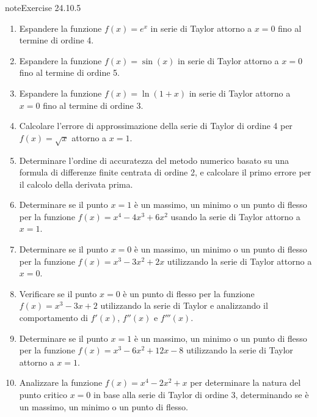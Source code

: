 \documentclass[letterpaper,10pt,italian]{jupyterBook}
\begin{document}
\begin{sphinxadmonition}{note}{Exercise 24.10.5}


\begin{enumerate}
%
\item {} 
\sphinxAtStartPar
Espandere la funzione \(f(x) = e^x\) in serie di Taylor attorno a \(x = 0\) fino al termine di ordine 4.

\item {} 
\sphinxAtStartPar
Espandere la funzione \(f(x) = \sin(x)\) in serie di Taylor attorno a \(x = 0\) fino al termine di ordine 5.

\item {} 
\sphinxAtStartPar
Espandere la funzione \(f(x) = \ln(1 + x)\) in serie di Taylor attorno a \(x = 0\) fino al termine di ordine 3.

\item {} 
\sphinxAtStartPar
Calcolare l’errore di approssimazione della serie di Taylor di ordine 4 per \(f(x) = \sqrt{x}\) attorno a \(x = 1\).

\item {} 
\sphinxAtStartPar
Determinare l’ordine di accuratezza del metodo numerico basato su una formula di differenze finite centrata di ordine 2, e calcolare il primo errore per il calcolo della derivata prima.

\item {} 
\sphinxAtStartPar
Determinare se il punto \(x = 1\) è un massimo, un minimo o un punto di flesso per la funzione \(f(x) = x^4 - 4x^3 + 6x^2\) usando la serie di Taylor attorno a \(x = 1\).

\item {} 
\sphinxAtStartPar
Determinare se il punto \(x = 0\) è un massimo, un minimo o un punto di flesso per la funzione \(f(x) = x^3 - 3x^2 + 2x\) utilizzando la serie di Taylor attorno a \(x = 0\).

\item {} 
\sphinxAtStartPar
Verificare se il punto \(x = 0\) è un punto di flesso per la funzione \(f(x) = x^3 - 3x + 2\) utilizzando la serie di Taylor e analizzando il comportamento di \(f'(x)\), \(f''(x)\) e \(f'''(x)\).

\item {} 
\sphinxAtStartPar
Determinare se il punto \(x = 1\) è un massimo, un minimo o un punto di flesso per la funzione \(f(x) = x^3 - 6x^2 + 12x - 8\) utilizzando la serie di Taylor attorno a \(x = 1\).

\item {} 
\sphinxAtStartPar
Analizzare la funzione \(f(x) = x^4 - 2x^2 + x\) per determinare la natura del punto critico \(x = 0\) in base alla serie di Taylor di ordine 3, determinando se è un massimo, un minimo o un punto di flesso.

\end{enumerate}
\end{sphinxadmonition}
\end{document}

